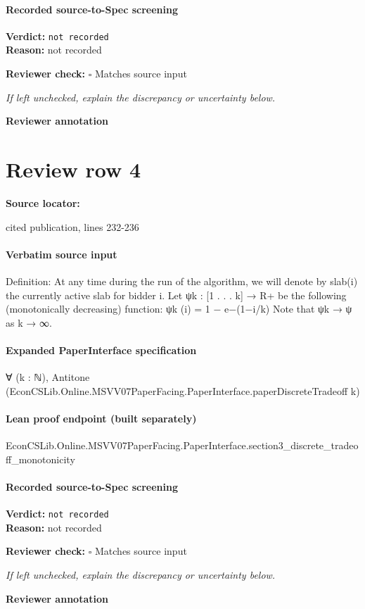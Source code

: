 \documentclass[10pt]{article}
\newcommand{\reviewerbox}{%
  \par\noindent\fbox{\parbox{0.96\linewidth}{\rule{0pt}{0.38in}}}\par
}
\newcommand{\reviewmatch}[1]{%
  \par\noindent\textbf{Reviewer check:} $\square$\; #1\par
  \noindent\emph{If left unchecked, explain the discrepancy or uncertainty below.}\par
}
\begin{document}
\paragraph{Recorded source-to-Spec screening}
\textbf{Verdict:} \texttt{not recorded}
\\
\textbf{Reason:} not recorded
\reviewmatch{Matches source input}
\noindent\textbf{Reviewer annotation}\par
\reviewerbox
\clearpage
\hypertarget{source-claim-fc8bcaf254f476c8}{}
\section*{Review row 4}
\textbf{Source locator:} {\footnotesize\raggedright cited publication, lines 232-\allowbreak{}236\par}
\paragraph{Verbatim source input}
\begin{ReviewVerbatim}
Definition: At any time during the run of the algorithm, we will denote by slab(i) the
currently active slab for bidder i.
Let ψk : [1 . . . k] → R+ be the following (monotonically decreasing) function:
ψk (i) = 1 − e−(1−i/k)
Note that ψk → ψ as k → ∞.
\end{ReviewVerbatim}


\paragraph{Expanded PaperInterface specification}
\begin{ReviewVerbatim}
∀ (k : ℕ), Antitone (EconCSLib.Online.MSVV07PaperFacing.PaperInterface.paperDiscreteTradeoff k)
\end{ReviewVerbatim}

\paragraph{Lean proof endpoint (built separately)}\begin{ReviewVerbatim}
EconCSLib.Online.MSVV07PaperFacing.PaperInterface.section3_discrete_tradeoff_monotonicity
\end{ReviewVerbatim}

\paragraph{Recorded source-to-Spec screening}
\textbf{Verdict:} \texttt{not recorded}
\\
\textbf{Reason:} not recorded
\reviewmatch{Matches source input}
\noindent\textbf{Reviewer annotation}\par
\reviewerbox
\clearpage
\hypertarget{source-claim-a450e97abd160146}{}
\end{document}
